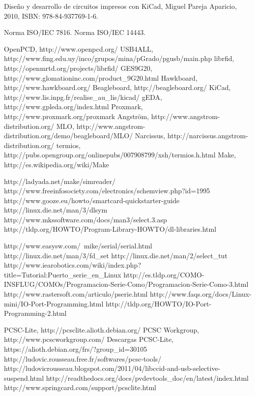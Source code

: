\begin{thebibliography}{200}
 Diseño y desarrollo de circuitos impresos con KiCad, Miguel Pareja Aparicio, 2010, ISBN: 978-84-937769-1-6.



 Norma ISO/IEC 7816.
 Norma ISO/IEC 14443.



 OpenPCD, http://www.openpcd.org/
 USB4ALL, http://www.fing.edu.uy/inco/grupos/mina/pGrado/pgusb/main.php
 librfid, http://openmrtd.org/projects/librfid/
 GES9G20, http://www.glomationinc.com/product\_9G20.html
 Hawkboard, http://www.hawkboard.org/
 Beagleboard, http://beagleboard.org/
 KiCad, http://www.lis.inpg.fr/realise\_au\_lis/kicad/
 gEDA, http://www.gpleda.org/index.html
 Proxmark, http://www.proxmark.org/proxmark
 Angström, http://www.angstrom-distribution.org/
 MLO, http://www.angstrom-distribution.org/demo/beagleboard/MLO/
 Narcissus, http://narcissus.angstrom-distribution.org/
 termios, http://pubs.opengroup.org/onlinepubs/007908799/xsh/termios.h.html
 Make, http://es.wikipedia.org/wiki/Make

\bibitem{} http://ladyada.net/make/simreader/
\bibitem{} http://www.freeinfosociety.com/electronics/schemview.php?id=1995
\bibitem{} http://www.gooze.eu/howto/smartcard-quickstarter-guide
\bibitem{} http://linux.die.net/man/3/dlsym
\bibitem{} http://www.mkssoftware.com/docs/man3/select.3.asp
\bibitem{} http://tldp.org/HOWTO/Program-Library-HOWTO/dl-libraries.html

\bibitem{} http://www.easysw.com/~mike/serial/serial.html
\bibitem{} http://linux.die.net/man/3/fd\_set
\bibitem{} http://linux.die.net/man/2/select\_tut
\bibitem{} http://www.iearobotics.com/wiki/index.php?title=Tutorial:Puerto\_serie\_en\_Linux
\bibitem{} http://es.tldp.org/COMO-INSFLUG/COMOs/Programacion-Serie-Como/Programacion-Serie-Como-3.html
\bibitem{} http://www.rastersoft.com/articulo/pserie.html
\bibitem{} http://www.faqs.org/docs/Linux-mini/IO-Port-Programming.html
\bibitem{} http://tldp.org/HOWTO/IO-Port-Programming-2.html

 PCSC-Lite, http://pcsclite.alioth.debian.org/
 PCSC Workgroup, http://www.pcscworkgroup.com/
 Descargas PCSC-Lite, https://alioth.debian.org/frs/?group\_id=30105
 http://ludovic.rousseau.free.fr/softwares/pcsc-tools/
\bibitem{} http://ludovicrousseau.blogspot.com/2011/04/libccid-and-usb-selective-suspend.html
\bibitem{} http://readthedocs.org/docs/pvdevtools\_doc/en/latest/index.html
\bibitem{} http://www.springcard.com/support/pcsclite.html



\end{thebibliography}
